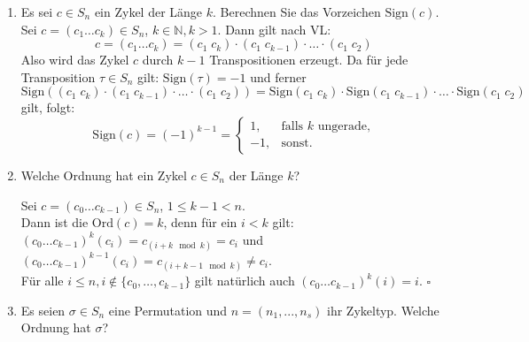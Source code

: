 \documentclass[11pt,a4paper,ngerman]{article}
\newcommand{\N}{\mathbb{N}}
\newcommand{\sign}{\text{Sign}}
\newcommand{\ord}{\text{Ord}}
\begin{document}
\begin{enumerate}[\bfseries a)]
\item Es sei $c \in S_n$ ein Zykel der Länge $k$. Berechnen Sie das Vorzeichen $\sign(c)$. \\

Sei $c = (c_1 \ldots c_k) \in S_n$, $k \in \N,k > 1$. Dann gilt nach VL:
$$ c = (c_1 \ldots c_k) = (c_1 \; c_k) \cdot (c_1 \; c_{k-1}) \cdot \ldots \cdot (c_1 \; c_2)$$
Also wird das Zykel $c$ durch $k-1$ Transpositionen erzeugt. Da für jede Transposition $\tau \in S_n$ gilt: $\sign(\tau) = -1$ und ferner
$$ \sign((c_1 \; c_k) \cdot (c_1 \; c_{k-1}) \cdot \ldots \cdot (c_1 \; c_2)) = \sign(c_1 \; c_k) \cdot \sign(c_1 \; c_{k-1}) \cdot \ldots \cdot \sign(c_1 \; c_2)$$
gilt, folgt:
$$ \sign(c) = (-1)^{k-1} = \begin{cases}
  1,  & \text{falls }k\text{ ungerade,}\\
  -1, & \text{sonst.}
\end{cases} $$
\item  Welche Ordnung hat ein Zykel $c \in S_n$ der Länge $k$?

Sei $c = (c_0 \ldots c_{k-1}) \in S_n$, $1 \leq k-1 < n$. \\
Dann ist die $\ord(c) = k$, denn für ein $i < k$ gilt:\\
$(c_0 \ldots c_{k-1})^k(c_i) = c_{(i+k \mod k)} = c_i$ und $(c_0 \ldots c_{k-1})^{k-1}(c_i) = c_{(i+k-1 \mod k)} \neq c_i$.\\
Für alle $i \leq n, i \notin \{c_0, \ldots ,c_{k-1} \}$ gilt natürlich auch $(c_0 \ldots c_{k-1})^k(i) = i$.
\mbox{} \hfill $\square$



\item Es seien $\sigma \in S_n$ eine Permutation und $n=(n_1,...,n_s)$ ihr Zykeltyp. Welche Ordnung hat $\sigma$?


\end{enumerate}
\end{document}
